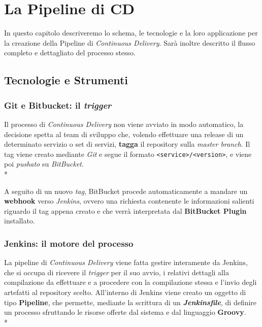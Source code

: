 \documentclass[../main.tex]{subfiles}
\begin{document}
    \chapter{La Pipeline di CD}
	
	    In questo capitolo descriveremo lo schema, le tecnologie e la loro applicazione per la creazione della Pipeline di \emph{Continuous Delivery}. Sarà inoltre descritto il flusso completo e dettagliato del processo stesso.
	
    	\section{Tecnologie e Strumenti}
    	
    	    \subsection{Git e Bitbucket: il \emph{trigger}}
    	    
    	        Il processo di \emph{Continuous Delivery} non viene avviato in modo automatico, la decisione spetta al team di sviluppo che, volendo effettuare una release di un determinato servizio o set di servizi, \textbf{tagga} il repository sulla \emph{master branch}. Il tag viene creato mediante \emph{Git} e segue il formato \verb|<service>/<version>|, e viene poi \emph{pushato} su \emph{BitBucket}.\\*
    	        
    	        A seguito di un nuovo \emph{tag}, BitBucket procede automaticamente a mandare un \textbf{webhook} verso \emph{Jenkins}, ovvero una richiesta contenente le informazioni salienti riguardo il tag appena creato e che verrà interpretata dal \textbf{BitBucket Plugin} installato.
    	
        	\subsection{Jenkins: il motore del processo}
        	
        	    La pipeline di \emph{Continuous Delivery} viene fatta gestire interamente da Jenkins, che si occupa di ricevere il \emph{trigger} per il suo avvio, i relativi dettagli alla compilazione da effettuare e a procedere con la compilazione stessa e l'invio degli artefatti al repository scelto. All'interno di Jenkins viene creato un oggetto di tipo \textbf{Pipeline}, che permette, mediante la scrittura di un \textbf{\emph{Jenkinsfile}}, di definire un processo sfruttando le risorse offerte dal sistema e dal linguaggio \textbf{Groovy}.\\*
        	    
\end{document}
